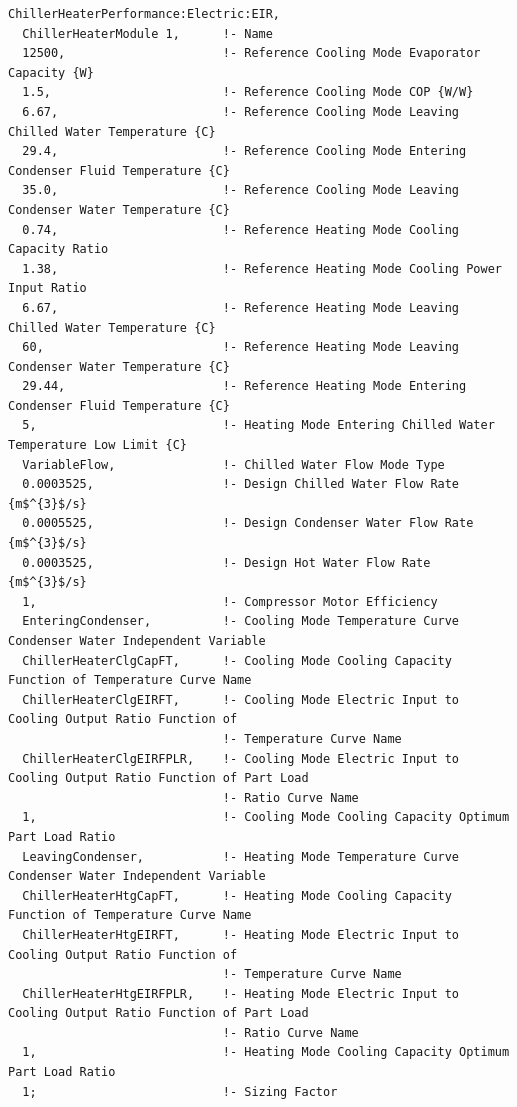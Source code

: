 \begin{lstlisting}
ChillerHeaterPerformance:Electric:EIR,
  ChillerHeaterModule 1,      !- Name
  12500,                      !- Reference Cooling Mode Evaporator Capacity {W}
  1.5,                        !- Reference Cooling Mode COP {W/W}
  6.67,                       !- Reference Cooling Mode Leaving Chilled Water Temperature {C}
  29.4,                       !- Reference Cooling Mode Entering Condenser Fluid Temperature {C}
  35.0,                       !- Reference Cooling Mode Leaving Condenser Water Temperature {C}
  0.74,                       !- Reference Heating Mode Cooling Capacity Ratio
  1.38,                       !- Reference Heating Mode Cooling Power Input Ratio
  6.67,                       !- Reference Heating Mode Leaving Chilled Water Temperature {C}
  60,                         !- Reference Heating Mode Leaving Condenser Water Temperature {C}
  29.44,                      !- Reference Heating Mode Entering Condenser Fluid Temperature {C}
  5,                          !- Heating Mode Entering Chilled Water Temperature Low Limit {C}
  VariableFlow,               !- Chilled Water Flow Mode Type
  0.0003525,                  !- Design Chilled Water Flow Rate {m$^{3}$/s}
  0.0005525,                  !- Design Condenser Water Flow Rate {m$^{3}$/s}
  0.0003525,                  !- Design Hot Water Flow Rate {m$^{3}$/s}
  1,                          !- Compressor Motor Efficiency
  EnteringCondenser,          !- Cooling Mode Temperature Curve Condenser Water Independent Variable
  ChillerHeaterClgCapFT,      !- Cooling Mode Cooling Capacity Function of Temperature Curve Name
  ChillerHeaterClgEIRFT,      !- Cooling Mode Electric Input to Cooling Output Ratio Function of
                              !- Temperature Curve Name
  ChillerHeaterClgEIRFPLR,    !- Cooling Mode Electric Input to Cooling Output Ratio Function of Part Load
                              !- Ratio Curve Name
  1,                          !- Cooling Mode Cooling Capacity Optimum Part Load Ratio
  LeavingCondenser,           !- Heating Mode Temperature Curve Condenser Water Independent Variable
  ChillerHeaterHtgCapFT,      !- Heating Mode Cooling Capacity Function of Temperature Curve Name
  ChillerHeaterHtgEIRFT,      !- Heating Mode Electric Input to Cooling Output Ratio Function of
                              !- Temperature Curve Name
  ChillerHeaterHtgEIRFPLR,    !- Heating Mode Electric Input to Cooling Output Ratio Function of Part Load
                              !- Ratio Curve Name
  1,                          !- Heating Mode Cooling Capacity Optimum Part Load Ratio
  1;                          !- Sizing Factor
\end{lstlisting}


